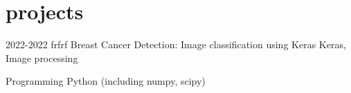 
\section{projects}

\begin{entrylist}


\entry
{2022-2022}
{frfrf}
{Breast Cancer Detection: Image classification using Keras}
{Keras, Image processing}


\minientry
{Programming}
{Python (including numpy, scipy)}

\end{entrylist}
